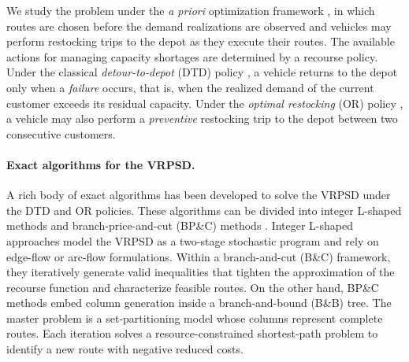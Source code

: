 \documentclass{article}
\newcommand{\rev}[1]{{\color{black}#1}}
\begin{document}
We study the problem under the \textit{a priori} optimization framework \cite{bertsimas1990priori}, in which routes are chosen before the demand realizations are observed \rev{and vehicles may perform restocking trips to the depot as they execute their routes. The available actions for managing capacity shortages are determined by a recourse policy. Under the classical \textit{detour-to-depot} (DTD) policy \cite{dror1989vehicle}, a vehicle returns to the depot only when a \textit{failure} occurs, that is, when the realized demand of the current customer exceeds its residual capacity. Under the \textit{optimal restocking} (OR) policy \cite{yee1980note, yang2000stochastic}, a vehicle may also perform a \textit{preventive} restocking trip to the depot between two consecutive customers.}

\paragraph{Exact algorithms for the VRPSD.} A rich body of exact algorithms has been developed to solve the VRPSD under the DTD and OR policies. These algorithms can be divided into integer L-shaped methods \cite{gendreau1995exact, hjorring1999new, laporte2002integer, jabali2014partial, louveaux2018exact, salavati2019exact, hoogendoorn2023improved, parada2024disaggregated, hoogendoorn2025evaluation} and branch-price-and-cut (BP\&C) methods \cite{christiansen2007branch, gauvin2014branch, florio2020new, florio2023recent}. Integer L-shaped approaches model the VRPSD as a two-stage stochastic program and rely on edge-flow or arc-flow formulations. Within a branch-and-cut (B\&C) framework, they iteratively generate valid inequalities that tighten the approximation of the recourse function and characterize feasible routes. On the other hand, BP\&C methods embed column generation inside a branch-and-bound (B\&B) tree. The master problem is a set-partitioning model whose columns represent complete routes. Each iteration solves a resource-constrained shortest-path problem \cite{irnich2005shortest} to identify a new route with negative reduced costs.
\end{document}
